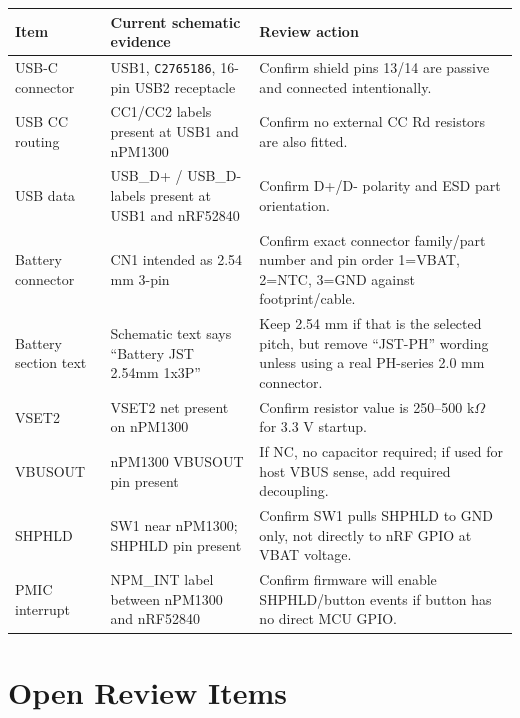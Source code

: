 \documentclass[11pt,a4paper]{article}
\newcommand{\partno}[1]{\texttt{#1}}
\begin{document}
\begin{table}[h]
\small
\begin{tabularx}{\textwidth}{llL}
\toprule
\textbf{Item} & \textbf{Current schematic evidence} & \textbf{Review action}\\
\midrule
USB-C connector & USB1, \partno{C2765186}, 16-pin USB2 receptacle & Confirm shield pins 13/14 are passive and connected intentionally.\\
USB CC routing & CC1/CC2 labels present at USB1 and nPM1300 & Confirm no external CC Rd resistors are also fitted.\\
USB data & USB\_D+ / USB\_D- labels present at USB1 and nRF52840 & Confirm D+/D- polarity and ESD part orientation.\\
Battery connector & CN1 intended as 2.54 mm 3-pin & Confirm exact connector family/part number and pin order 1=VBAT, 2=NTC, 3=GND against footprint/cable.\\
Battery section text & Schematic text says ``Battery JST 2.54mm 1x3P'' & Keep 2.54 mm if that is the selected pitch, but remove ``JST-PH'' wording unless using a real PH-series 2.0 mm connector.\\
VSET2 & VSET2 net present on nPM1300 & Confirm resistor value is 250--500 k$\Omega$ for 3.3 V startup.\\
VBUSOUT & nPM1300 VBUSOUT pin present & If NC, no capacitor required; if used for host VBUS sense, add required decoupling.\\
SHPHLD & SW1 near nPM1300; SHPHLD pin present & Confirm SW1 pulls SHPHLD to GND only, not directly to nRF GPIO at VBAT voltage.\\
PMIC interrupt & NPM\_INT label between nPM1300 and nRF52840 & Confirm firmware will enable SHPHLD/button events if button has no direct MCU GPIO.\\
\bottomrule
\end{tabularx}
\end{table}

\section{Open Review Items}
\end{document}
